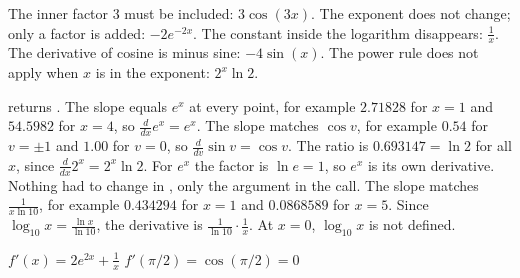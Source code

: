 \begin{facit}
  The inner factor $3$ must be included: $3\cos(3x)$.
 The exponent does not change; only a factor is added: $-2e^{-2x}$.
 The constant inside the logarithm disappears: $\frac{1}{x}$.
 The derivative of cosine is minus sine: $-4\sin(x)$.
 The power rule does not apply when $x$ is in the exponent: $2^x \ln 2$.

   returns .
 The slope equals $e^x$ at every point, for example $2.71828$ for $x = 1$ and $54.5982$ for
$x = 4$, so $\frac{d}{dx}e^x = e^x$.
 The slope matches $\cos v$, for example $0.54$ for $v = \pm 1$ and $1.00$ for $v = 0$, so
$\frac{d}{dv}\sin v = \cos v$.
 The ratio is $0.693147 = \ln 2$ for all $x$, since $\frac{d}{dx}2^x = 2^x \ln 2$. For
$e^x$ the factor is $\ln e = 1$, so $e^x$ is its own derivative. Nothing had to change in
, only the argument in the call.
 The slope matches $\frac{1}{x \ln 10}$, for example $0.434294$ for $x = 1$ and $0.0868589$
for $x = 5$. Since $\log_{10} x = \frac{\ln x}{\ln 10}$, the derivative is $\frac{1}{\ln 10} \cdot
\frac{1}{x}$. At $x = 0$, $\log_{10} x$ is not defined.

  $f'(x) = 2e^{2x} + \frac{1}{x}$
 $f'(\pi/2) = \cos(\pi/2) = 0$

\end{facit}
